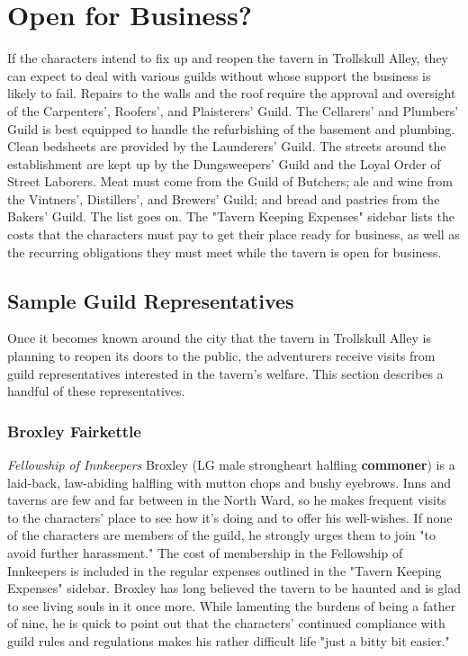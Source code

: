 \documentclass[10pt,a4paper,twoside,twocolumn,openany,nodeprecatedcode]{dndbook}
\begin{document}
\section{Open for Business?}
If the characters intend to fix up and reopen the tavern in Trollskull Alley, they can expect to deal with various guilds without whose support the business is likely to fail. Repairs to the walls and the roof require the approval and oversight of the Carpenters', Roofers', and Plaisterers' Guild. The Cellarers' and Plumbers' Guild is best equipped to handle the refurbishing of the basement and plumbing. Clean bedsheets are provided by the Launderers' Guild. The streets around the establishment are kept up by the Dungsweepers' Guild and the Loyal Order of Street Laborers. Meat must come from the Guild of Butchers; ale and wine from the Vintners', Distillers', and Brewers' Guild; and bread and pastries from the Bakers' Guild. The list goes on.
The "Tavern Keeping Expenses" sidebar lists the costs that the characters must pay to get their place ready for business, as well as the recurring obligations they must meet while the tavern is open for business.
\subsection{Sample Guild Representatives}
Once it becomes known around the city that the tavern in Trollskull Alley is planning to reopen its doors to the public, the adventurers receive visits from guild representatives interested in the tavern's welfare. This section describes a handful of these representatives.
\subsubsection{Broxley Fairkettle}
\textit{Fellowship of Innkeepers}
Broxley (LG male strongheart halfling \textbf{commoner}) is a laid-back, law-abiding halfling with mutton chops and bushy eyebrows. Inns and taverns are few and far between in the North Ward, so he makes frequent visits to the characters' place to see how it's doing and to offer his well-wishes. If none of the characters are members of the guild, he strongly urges them to join "to avoid further harassment." The cost of membership in the Fellowship of Innkeepers is included in the regular expenses outlined in the "Tavern Keeping Expenses" sidebar.
Broxley has long believed the tavern to be haunted and is glad to see living souls in it once more. While lamenting the burdens of being a father of nine, he is quick to point out that the characters' continued compliance with guild rules and regulations makes his rather difficult life "just a bitty bit easier."
\end{document}
